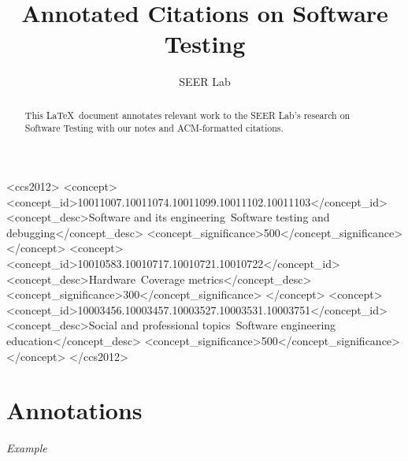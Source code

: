 \documentclass[10pt,sigconf]{acmart}
\begin{document}
\title{Annotated Citations on Software Testing}

\author{SEER Lab}


\begin{abstract}
This \LaTeX\ document annotates relevant work to the SEER Lab's research on
Software Testing with our notes and ACM-formatted citations.
\end{abstract}

%
%
\begin{CCSXML}
<ccs2012>
   <concept>
       <concept_id>10011007.10011074.10011099.10011102.10011103</concept_id>
       <concept_desc>Software and its engineering~Software testing and debugging</concept_desc>
       <concept_significance>500</concept_significance>
       </concept>
   <concept>
       <concept_id>10010583.10010717.10010721.10010722</concept_id>
       <concept_desc>Hardware~Coverage metrics</concept_desc>
       <concept_significance>300</concept_significance>
       </concept>
   <concept>
       <concept_id>10003456.10003457.10003527.10003531.10003751</concept_id>
       <concept_desc>Social and professional topics~Software engineering education</concept_desc>
       <concept_significance>500</concept_significance>
       </concept>
 </ccs2012>
\end{CCSXML}




\maketitle

\section{Annotations}

\textit{Example}

\end{document}
